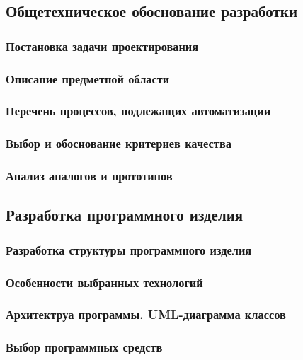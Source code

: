 \documentclass[russian,utf8,emptystyle]{eskdtext}
\begin{document}
\subsection{Общетехническое обоснование разработки}
\subsubsection{Постановка задачи проектирования}

\subsubsection{Описание предметной области}

\subsubsection{Перечень процессов, подлежащих автоматизации}

\subsubsection{Выбор и обоснование критериев качества}

\subsubsection{Анализ аналогов и прототипов}

\newpage
\subsection{Разработка программного изделия}
\subsubsection{Разработка структуры программного изделия}

\subsubsection{Особенности выбранных технологий}

\subsubsection{Архитектруа программы. UML-диаграмма классов}

\subsubsection{Выбор программных средств}
\end{document}
